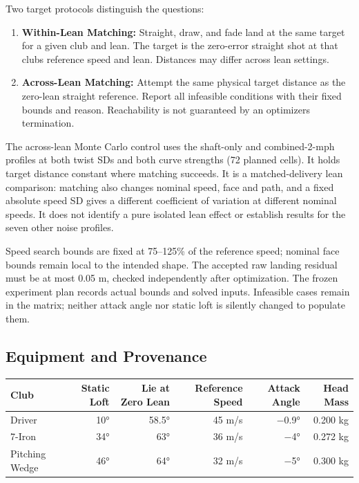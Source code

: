 \documentclass[
]{article}
\providecommand{\tightlist}{%
  \setlength{\itemsep}{0pt}\setlength{\parskip}{0pt}}
\begin{document}
Two target protocols distinguish the questions:

\begin{enumerate}
\def\labelenumi{\arabic{enumi}.}
\tightlist
\item
  \textbf{Within-Lean Matching:} Straight, draw, and fade land at the
  same target for a given club and lean. The target is the zero-error
  straight shot at that club\textquotesingle s reference speed and lean.
  Distances may differ across lean settings.
\item
  \textbf{Across-Lean Matching:} Attempt the same physical target
  distance as the zero-lean straight reference. Report all infeasible
  conditions with their fixed bounds and reason. Reachability is not
  guaranteed by an optimizer\textquotesingle s termination.
\end{enumerate}

The across-lean Monte Carlo control uses the shaft-only and
combined-2-mph profiles at both twist SDs and both curve strengths (72
planned cells). It holds target distance constant where matching
succeeds. It is a matched-delivery lean comparison: matching also
changes nominal speed, face and path, and a fixed absolute speed SD
gives a different coefficient of variation at different nominal speeds.
It does not identify a pure isolated lean effect or establish results
for the seven other noise profiles.

Speed search bounds are fixed at 75--125\% of the reference speed;
nominal face bounds remain local to the intended shape. The accepted raw
landing residual must be at most 0.05 m, checked independently after
optimization. The frozen experiment plan records actual bounds and
solved inputs. Infeasible cases remain in the matrix; neither attack
angle nor static loft is silently changed to populate them.

\subsection{Equipment and Provenance}\label{equipment-and-provenance}

\begin{longtable}[]{@{}lrrrrr@{}}
\toprule\noalign{}
Club & Static Loft & Lie at Zero Lean & Reference Speed & Attack Angle &
Head Mass \\
\midrule\noalign{}
\endhead
\bottomrule\noalign{}
\endlastfoot
Driver & 10° & 58.5° & 45 m/s & −0.9° & 0.200 kg \\
7-Iron & 34° & 63° & 36 m/s & −4° & 0.272 kg \\
Pitching Wedge & 46° & 64° & 32 m/s & −5° & 0.300 kg \\
\end{longtable}
\end{document}
